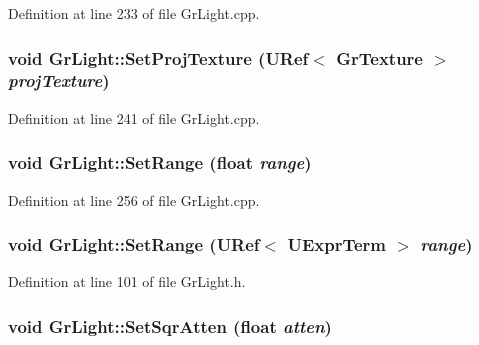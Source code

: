 Definition at line 233 of file GrLight.cpp.\hypertarget{class_gr_light_d954c2024dcae8ba4abd4f8081dc7db9}{
\subsubsection[{SetProjTexture}]{\setlength{\rightskip}{0pt plus 5cm}void GrLight::SetProjTexture ({\bf URef}$<$ {\bf GrTexture} $>$ {\em projTexture})}}
\label{class_gr_light_d954c2024dcae8ba4abd4f8081dc7db9}




Definition at line 241 of file GrLight.cpp.\hypertarget{class_gr_light_c3e94f351a1f1b794012085bf064567f}{
\subsubsection[{SetRange}]{\setlength{\rightskip}{0pt plus 5cm}void GrLight::SetRange (float {\em range})}}
\label{class_gr_light_c3e94f351a1f1b794012085bf064567f}




Definition at line 256 of file GrLight.cpp.\hypertarget{class_gr_light_509f7eed244a60f3b27281049b7410e2}{
\subsubsection[{SetRange}]{\setlength{\rightskip}{0pt plus 5cm}void GrLight::SetRange ({\bf URef}$<$ {\bf UExprTerm} $>$ {\em range})}}
\label{class_gr_light_509f7eed244a60f3b27281049b7410e2}




Definition at line 101 of file GrLight.h.\hypertarget{class_gr_light_85197478e33da961098f11a9f63e31e1}{
\subsubsection[{SetSqrAtten}]{\setlength{\rightskip}{0pt plus 5cm}void GrLight::SetSqrAtten (float {\em atten})}}
\label{class_gr_light_85197478e33da961098f11a9f63e31e1}




